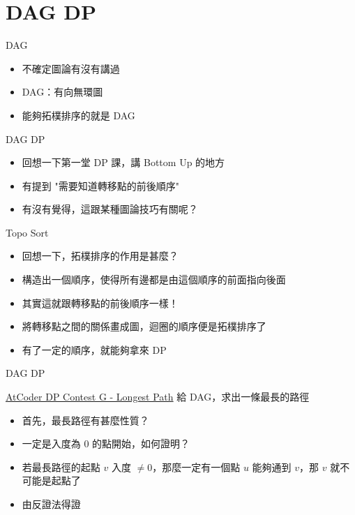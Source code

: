 \documentclass[aspectratio=169]{beamer}
\begin{document}
    \section{DAG DP}

    \begin{frame}{DAG}
        \begin{itemize}
            \item 不確定圖論有沒有講過
            \item DAG：有向無環圖
            \item 能夠拓樸排序的就是 DAG
        \end{itemize}
    \end{frame}

    \begin{frame}{DAG DP}
        \begin{itemize}
            \item 回想一下第一堂 DP 課，講 Bottom Up 的地方
            \item 有提到 "需要知道轉移點的前後順序"
            \item 有沒有覺得，這跟某種圖論技巧有關呢？
        \end{itemize}
    \end{frame}

    \begin{frame}{Topo Sort}
        \begin{itemize}
            \item<1-> 回想一下，拓樸排序的作用是甚麼？
            \item<2-> 構造出一個順序，使得所有邊都是由這個順序的前面指向後面
            \item<3-> 其實這就跟轉移點的前後順序一樣！
            \item<4-> 將轉移點之間的關係畫成圖，迴圈的順序便是拓樸排序了
            \item<5-> 有了一定的順序，就能夠拿來 DP
        \end{itemize}
    \end{frame}

    \begin{frame}{DAG DP}
        \begin{block}{\href{https://atcoder.jp/contests/dp/tasks/dp_g}{AtCoder DP Contest G - Longest Path}}
            給 DAG，求出一條最長的路徑
        \end{block}

        \begin{itemize}
            \item<1-> 首先，最長路徑有甚麼性質？
            \item<2-> 一定是入度為 0 的點開始，如何證明？
            \item<3-> 若最長路徑的起點 $v$ 入度 $\neq 0$，那麼一定有一個點 $u$ 能夠通到 $v$，那 $v$ 就不可能是起點了
            \item<4-> 由反證法得證
        \end{itemize}
    \end{frame}
\end{document}
